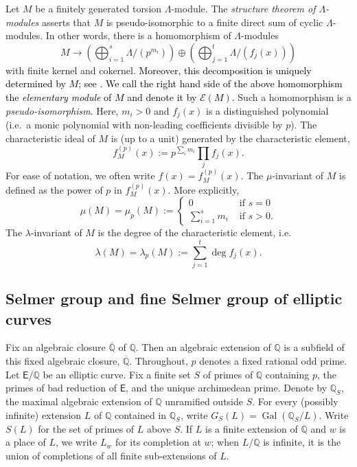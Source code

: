 \documentclass{amsart}
\newcommand{\edit}[1]{\textcolor{black}{#1}}
\numberwithin{equation}{section}
\theoremstyle{remark}
\newcommand{\EC}{\mathsf{E}}
\newcommand{\Gal}{\operatorname{Gal}}
\newcommand{\Q}{\mathbb{Q}}
\theoremstyle{plain} %
\begin{document}
Let $M$ be a finitely generated torsion $\Lambda$-module.
The \emph{structure theorem of $\Lambda$-modules} \cite[Theorem~13.12]{Was97} asserts that $M$ is pseudo-isomorphic to a finite direct sum of cyclic $\Lambda$-modules.
In other words, there is a homomorphism of $\Lambda$-modules
\[
M \longrightarrow \left(\bigoplus_{i=1}^s \Lambda/(p^{m_i})\right)\oplus \left(\bigoplus_{j=1}^t \Lambda/(f_j(x)) \right)
\]
with finite kernel and cokernel.
\edit{Moreover, this decomposition is uniquely determined by $M$; see \cite[Corollary~15.19]{Was97}.
We call
the right hand side of the above homomorphism the \textit{elementary module} of $M$ and denote it by $\mathscr{E}(M)$.}
Such a homomorphism is a \emph{pseudo-isomorphism}.
Here, $m_i>0$ and $f_j(x)$ is a distinguished polynomial (i.e.~a monic polynomial with non-leading coefficients divisible by $p$).
The characteristic ideal of $M$ is (up to a unit) generated by the characteristic element,
\[
f_{M}^{(p)}(x) := p^{\sum_{i} m_i} \prod_j f_j(x).
\]
For ease of notation, we often write $f(x) = f_M^{(p)}(x)$.
The $\mu$-invariant of $M$ is defined as the power of $p$ in $f_{M}^{(p)}(x)$.
More explicitly,
\[
\mu(M) = \mu_p(M):=\begin{cases}0 & \textrm{ if } s=0\\
\sum_{i=1}^s m_i & \textrm{ if } s>0.
\end{cases}
\]
The $\lambda$-invariant of $M$ is the degree of the characteristic element, i.e.
\[
\lambda(M) = \lambda_p(M) := \sum_{j=1}^t \deg f_j(x).
\]


\subsection{Selmer group and fine Selmer group of elliptic curves}
Fix an algebraic closure $\overline{\Q}$ of $\Q$.
Then an algebraic extension of $\Q$ is a subfield of this fixed algebraic closure, $\overline{\Q}$.
Throughout, $p$ denotes a fixed rational odd prime.
Let $\EC/\Q$ be an elliptic curve.
Fix a finite set $S$ of primes of $\Q$ containing $p$, the primes of bad reduction of $\EC$, and the unique archimedean prime.
Denote by $\Q_S$, the maximal algebraic extension of $\Q$ unramified outside $S$.
For every (possibly infinite) extension $L$ of $\Q$ contained in $\Q_S$, write $G_S\left({L}\right) = \Gal\left(\Q_S/{L}\right)$.
Write $S\left(L\right)$ for the set of primes of $L$ above $S$.
If $L$ is a finite extension of $\Q$ and $w$ is a place of $L$, we write $L_w$ for its completion at $w$; when $L/\Q$ is infinite, it is the union of completions of all finite sub-extensions of $L$.
\end{document}
